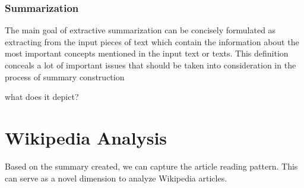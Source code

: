 \documentclass[12pt]{article}
\begin{document}
        
        
\subsubsection{Summarization}


The main goal of extractive summarization can be
concisely formulated as extracting from the input
pieces of text which contain the information about
the most important concepts mentioned in the input
text or texts. This definition conceals a lot of important issues that should be taken into consideration
in the process of summary construction

what does it depict?




%
%


\section{Wikipedia Analysis}\label{sec:Analysis}
Based on the summary created, we can capture the article reading pattern. This can serve as a novel dimension to analyze Wikipedia articles. 
\end{document}
